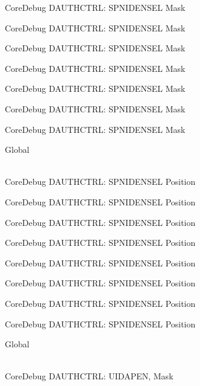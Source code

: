 \begin{DoxyRefList}
\label{deprecated__deprecated000142}%
%
Core\+Debug DAUTHCTRL\+: SPNIDENSEL Mask 

\label{deprecated__deprecated000218}%
%
Core\+Debug DAUTHCTRL\+: SPNIDENSEL Mask 

\label{deprecated__deprecated000281}%
%
Core\+Debug DAUTHCTRL\+: SPNIDENSEL Mask 

\label{deprecated__deprecated000360}%
%
Core\+Debug DAUTHCTRL\+: SPNIDENSEL Mask 

\label{deprecated__deprecated000436}%
%
Core\+Debug DAUTHCTRL\+: SPNIDENSEL Mask 

\label{deprecated__deprecated000539}%
%
Core\+Debug DAUTHCTRL\+: SPNIDENSEL Mask 

\label{deprecated__deprecated000641}%
%
Core\+Debug DAUTHCTRL\+: SPNIDENSEL Mask  
\item[{\parbox[t]{\linewidth}{Global \doxylink{group___c_m_s_i_s___s_c_b_ga866734a8e4bec2d6cf091e265c6c0f3d}{Core\+Debug\+\_\+\+DAUTHCTRL\+\_\+\+SPNIDENSEL\+\_\+\+Pos} }}]\hfill \\
\label{deprecated__deprecated000087}%
%
Core\+Debug DAUTHCTRL\+: SPNIDENSEL Position 

\label{deprecated__deprecated000141}%
%
Core\+Debug DAUTHCTRL\+: SPNIDENSEL Position 

\label{deprecated__deprecated000217}%
%
Core\+Debug DAUTHCTRL\+: SPNIDENSEL Position 

\label{deprecated__deprecated000280}%
%
Core\+Debug DAUTHCTRL\+: SPNIDENSEL Position 

\label{deprecated__deprecated000359}%
%
Core\+Debug DAUTHCTRL\+: SPNIDENSEL Position 

\label{deprecated__deprecated000435}%
%
Core\+Debug DAUTHCTRL\+: SPNIDENSEL Position 

\label{deprecated__deprecated000538}%
%
Core\+Debug DAUTHCTRL\+: SPNIDENSEL Position 

\label{deprecated__deprecated000640}%
%
Core\+Debug DAUTHCTRL\+: SPNIDENSEL Position  
\item[{\parbox[t]{\linewidth}{Global \doxylink{group___c_m_s_i_s___s_c_b_gad69e7195bbc5074466387d9c4d8bd529}{Core\+Debug\+\_\+\+DAUTHCTRL\+\_\+\+UIDAPEN\+\_\+\+Msk} }}]\hfill \\
\label{deprecated__deprecated000082}%
%
Core\+Debug DAUTHCTRL\+: UIDAPEN, Mask 


\end{DoxyRefList}
